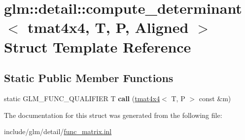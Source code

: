 \hypertarget{structglm_1_1detail_1_1compute__determinant_3_01tmat4x4_00_01T_00_01P_00_01Aligned_01_4}{}\section{glm\+:\+:detail\+:\+:compute\+\_\+determinant$<$ tmat4x4, T, P, Aligned $>$ Struct Template Reference}
\label{structglm_1_1detail_1_1compute__determinant_3_01tmat4x4_00_01T_00_01P_00_01Aligned_01_4}
\subsection*{Static Public Member Functions}
\begin{DoxyCompactItemize}
\item 
\mbox{\label{structglm_1_1detail_1_1compute__determinant_3_01tmat4x4_00_01T_00_01P_00_01Aligned_01_4_ad11c7e1b074be572d4af7ba440866ea3}} 
static G\+L\+M\+\_\+\+F\+U\+N\+C\+\_\+\+Q\+U\+A\+L\+I\+F\+I\+ER T {\bfseries call} (\hyperlink{structglm_1_1tmat4x4}{tmat4x4}$<$ T, P $>$ const \&m)
\end{DoxyCompactItemize}


The documentation for this struct was generated from the following file\+:\begin{DoxyCompactItemize}
\item 
include/glm/detail/\hyperlink{func__matrix_8inl}{func\+\_\+matrix.\+inl}\end{DoxyCompactItemize}
